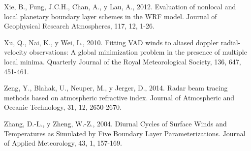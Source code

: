 \documentclass[12pt,spanish,oneside]{book}
\begin{document}
\hypertarget{ref-Xie2012}{}
Xie, B., Fung, J.C.H., Chan, A., y Lau, A., 2012. Evaluation of nonlocal
and local planetary boundary layer schemes in the WRF model. Journal of
Geophysical Research Atmospheres, 117, 12, 1-26.

\hypertarget{ref-Xu2010}{}
Xu, Q., Nai, K., y Wei, L., 2010. Fitting VAD winds to aliased doppler
radial-velocity observations: A global minimization problem in the
presence of multiple local minima. Quarterly Journal of the Royal
Meteorological Society, 136, 647, 451-461.

\hypertarget{ref-Zeng2014}{}
Zeng, Y., Blahak, U., Neuper, M., y Jerger, D., 2014. Radar beam tracing
methods based on atmospheric refractive index. Journal of Atmospheric
and Oceanic Technology, 31, 12, 2650-2670.

\hypertarget{ref-Zhang2004}{}
Zhang, D.-L., y Zheng, W.-Z., 2004. Diurnal Cycles of Surface Winds and
Temperatures as Simulated by Five Boundary Layer Parameterizations.
Journal of Applied Meteorology, 43, 1, 157-169.
\end{document}
